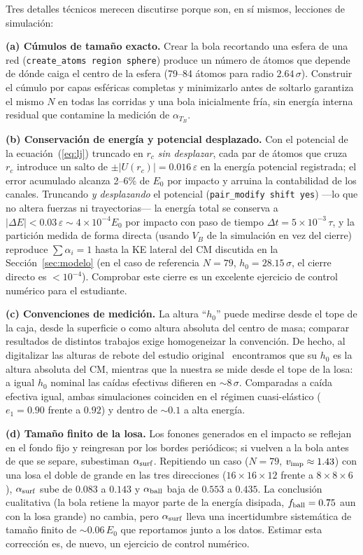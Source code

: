 \documentclass[10pt,a4paper,twocolumn]{article}
\newcommand{\eps}{\varepsilon}
\begin{document}
Tres detalles técnicos merecen discutirse porque son, en sí mismos,
lecciones de simulación:

\textbf{(a) Cúmulos de tamaño exacto.} Crear la bola recortando una esfera
de una red (\texttt{create\_atoms region sphere}) produce un número de
átomos que depende de dónde caiga el centro de la esfera (79--84 átomos
para radio $2.64\,\sigma$). Construir el cúmulo por capas esféricas
completas y minimizarlo antes de soltarlo garantiza el mismo $N$ en todas
las corridas y una bola inicialmente fría, sin energía interna residual
que contamine la medición de $\alpha_{T_B}$.

\textbf{(b) Conservación de energía y potencial desplazado.} Con el
potencial de la ecuación~(\ref{eq:lj}) truncado en $r_c$ \emph{sin
desplazar}, cada par de átomos que cruza $r_c$ introduce un salto de
$\pm|U(r_c)|=0.016\,\eps$ en la energía potencial registrada; el error
acumulado alcanza 2--6\% de $E_0$ por impacto y arruina la contabilidad de
los canales. Truncando \emph{y desplazando} el potencial
(\texttt{pair\_modify shift yes}) ---lo que no altera fuerzas ni
trayectorias--- la energía total se conserva a
$|\Delta E|<0.03\,\eps\sim4\times10^{-4}E_0$ por impacto con paso de
tiempo $\Delta t=5\times10^{-3}\,\tau$, y la partición medida de forma
directa (usando $V_B$ de la simulación en vez del cierre) reproduce
$\sum\alpha_i=1$ hasta la KE lateral del CM discutida en la
Sección~\ref{sec:modelo} (en el caso de referencia $N=79$,
$h_0=28.15\,\sigma$, el cierre directo es $<10^{-4}$). Comprobar este
cierre es un excelente ejercicio de control numérico para el estudiante.

\textbf{(c) Convenciones de medición.} La altura ``$h_0$'' puede medirse
desde el tope de la caja, desde la superficie o como altura absoluta del
centro de masa; comparar resultados de distintos trabajos exige
homogeneizar la convención. De hecho, al digitalizar las alturas de
rebote del estudio original~\cite{Gutierrez2012} encontramos que su $h_0$
es la altura absoluta del CM, mientras que la nuestra se mide desde el
tope de la losa: a igual $h_0$ nominal las caídas efectivas difieren en
$\sim8\,\sigma$. Comparadas a caída efectiva igual, ambas simulaciones
coinciden en el régimen cuasi-elástico ($e_1=0.90$ frente a $0.92$) y
dentro de $\sim0.1$ a alta energía.

\textbf{(d) Tamaño finito de la losa.} Los fonones generados en el impacto se
reflejan en el fondo fijo y reingresan por los bordes periódicos; si vuelven a
la bola antes de que se separe, subestiman $\alpha_{\rm surf}$. Repitiendo un
caso ($N=79$, $v_{\rm imp}\approx1.43$) con una losa el doble de grande en las
tres direcciones ($16\times16\times12$ frente a $8\times8\times6$),
$\alpha_{\rm surf}$ sube de $0.083$ a $0.143$ y $\alpha_{\rm ball}$ baja de
$0.553$ a $0.435$. La conclusión cualitativa (la bola retiene la mayor parte
de la energía disipada, $f_{\rm ball}=0.75$ aun con la losa grande) no cambia,
pero $\alpha_{\rm surf}$ lleva una incertidumbre sistemática de tamaño finito
de $\sim0.06\,E_0$ que reportamos junto a los datos. Estimar esta corrección
es, de nuevo, un ejercicio de control numérico.
\end{document}
